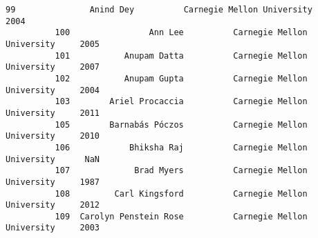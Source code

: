 \documentclass[11pt]{article}
\begin{document}
\begin{Verbatim}[commandchars=\\\{\}]
          99               Anind Dey          Carnegie Mellon University     2004   
          100                Ann Lee          Carnegie Mellon University     2005   
          101           Anupam Datta          Carnegie Mellon University     2007   
          102           Anupam Gupta          Carnegie Mellon University     2004   
          103        Ariel Procaccia          Carnegie Mellon University     2011   
          105        Barnabás Póczos          Carnegie Mellon University     2010   
          106            Bhiksha Raj          Carnegie Mellon University      NaN   
          107             Brad Myers          Carnegie Mellon University     1987   
          108         Carl Kingsford          Carnegie Mellon University     2012   
          109  Carolyn Penstein Rose          Carnegie Mellon University     2003   
          

\end{Verbatim}
\end{document}
